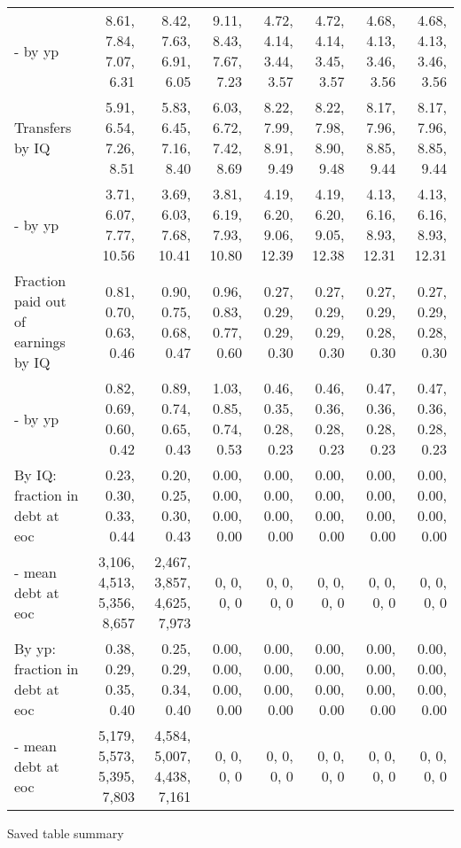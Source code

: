 \begin{tabular}{lrrrrrrr}
- by yp & 8.61, 7.84, 7.07, 6.31  & 8.42, 7.63, 6.91, 6.05  & 9.11, 8.43, 7.67, 7.23  & 4.72, 4.14, 3.44, 3.57  & 4.72, 4.14, 3.45, 3.57  & 4.68, 4.13, 3.46, 3.56  & 4.68, 4.13, 3.46, 3.56  \\
Transfers by IQ & 5.91, 6.54, 7.26, 8.51  & 5.83, 6.45, 7.16, 8.40  & 6.03, 6.72, 7.42, 8.69  & 8.22, 7.99, 8.91, 9.49  & 8.22, 7.98, 8.90, 9.48  & 8.17, 7.96, 8.85, 9.44  & 8.17, 7.96, 8.85, 9.44  \\
- by yp & 3.71, 6.07, 7.77, 10.56  & 3.69, 6.03, 7.68, 10.41  & 3.81, 6.19, 7.93, 10.80  & 4.19, 6.20, 9.06, 12.39  & 4.19, 6.20, 9.05, 12.38  & 4.13, 6.16, 8.93, 12.31  & 4.13, 6.16, 8.93, 12.31  \\
Fraction paid out of earnings by IQ & 0.81, 0.70, 0.63, 0.46  & 0.90, 0.75, 0.68, 0.47  & 0.96, 0.83, 0.77, 0.60  & 0.27, 0.29, 0.29, 0.30  & 0.27, 0.29, 0.29, 0.30  & 0.27, 0.29, 0.28, 0.30  & 0.27, 0.29, 0.28, 0.30  \\
- by yp & 0.82, 0.69, 0.60, 0.42  & 0.89, 0.74, 0.65, 0.43  & 1.03, 0.85, 0.74, 0.53  & 0.46, 0.35, 0.28, 0.23  & 0.46, 0.36, 0.28, 0.23  & 0.47, 0.36, 0.28, 0.23  & 0.47, 0.36, 0.28, 0.23  \\
By IQ: fraction in debt at eoc & 0.23, 0.30, 0.33, 0.44  & 0.20, 0.25, 0.30, 0.43  & 0.00, 0.00, 0.00, 0.00  & 0.00, 0.00, 0.00, 0.00  & 0.00, 0.00, 0.00, 0.00  & 0.00, 0.00, 0.00, 0.00  & 0.00, 0.00, 0.00, 0.00  \\
- mean debt at eoc & 3,106, 4,513, 5,356, 8,657  & 2,467, 3,857, 4,625, 7,973  & 0, 0, 0, 0  & 0, 0, 0, 0  & 0, 0, 0, 0  & 0, 0, 0, 0  & 0, 0, 0, 0  \\
By yp: fraction in debt at eoc & 0.38, 0.29, 0.35, 0.40  & 0.25, 0.29, 0.34, 0.40  & 0.00, 0.00, 0.00, 0.00  & 0.00, 0.00, 0.00, 0.00  & 0.00, 0.00, 0.00, 0.00  & 0.00, 0.00, 0.00, 0.00  & 0.00, 0.00, 0.00, 0.00  \\
- mean debt at eoc & 5,179, 5,573, 5,395, 7,803  & 4,584, 5,007, 4,438, 7,161  & 0, 0, 0, 0  & 0, 0, 0, 0  & 0, 0, 0, 0  & 0, 0, 0, 0  & 0, 0, 0, 0  \\
\hline
\end{tabular}%
Saved table summary

